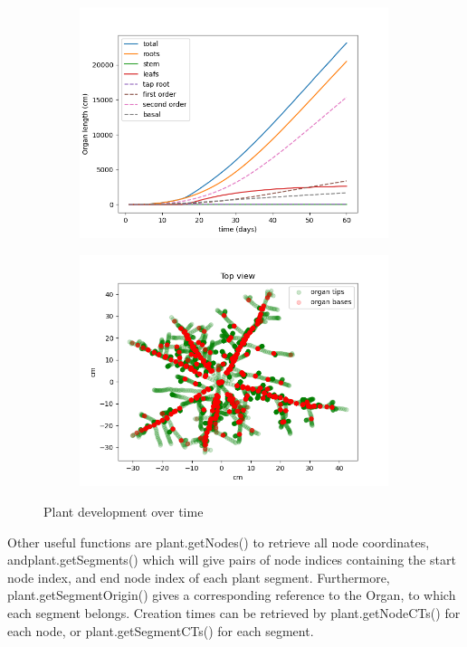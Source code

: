 \begin{figure}
\begin{subfigure}[c]{0.5\textwidth}
\includegraphics[width=0.99\textwidth]{figures/topics_development.png}
 \label{fig:topics_development}
\end{subfigure} 
\begin{subfigure}[c]{0.5\textwidth}
\includegraphics[width=0.99\textwidth]{figures/topics_development2.png}
 \label{fig:topics_development2}
\end{subfigure}
\caption{Plant development over time} 
\end{figure}

Other useful functions are {plant.getNodes()} to retrieve all node coordinates, and{plant.getSegments()} which will give pairs of node indices containing the start node index, and end node index of each plant segment. Furthermore, {plant.getSegmentOrigin()} gives a corresponding reference to the Organ, to which each segment belongs. Creation times can be retrieved by {plant.getNodeCTs()} for each node, or {plant.getSegmentCTs()} for each segment.
